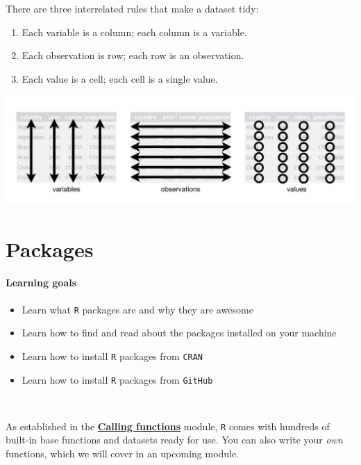 \documentclass[
]{book}
\providecommand{\tightlist}{%
  \setlength{\itemsep}{0pt}\setlength{\parskip}{0pt}}
\begin{document}
There are three interrelated rules that make a dataset tidy:

\begin{enumerate}
\def\labelenumi{\arabic{enumi}.}
\tightlist
\item
  Each variable is a column; each column is a variable.
\item
  Each observation is row; each row is an observation.
\item
  Each value is a cell; each cell is a single value.
\end{enumerate}

\includegraphics[width=7.11in]{img/tidy-1}

\hypertarget{packages}{%
\chapter{Packages}\label{packages}}

\hypertarget{learning-goals-6}{%
\subsubsection*{Learning goals}\label{learning-goals-6}}

\begin{itemize}
\tightlist
\item
  Learn what \texttt{R} packages are and why they are awesome
\item
  Learn how to find and read about the packages installed on your machine
\item
  Learn how to install \texttt{R} packages from \texttt{CRAN}
\item
  Learn how to install \texttt{R} packages from \texttt{GitHub}
\end{itemize}

~

As established in the \protect\hyperlink{calling_functions}{\textbf{Calling functions}} module, \texttt{R} comes with hundreds of built-in base functions and datasets ready for use. You can also write your \emph{own} functions, which we will cover in an upcoming module.
\end{document}
